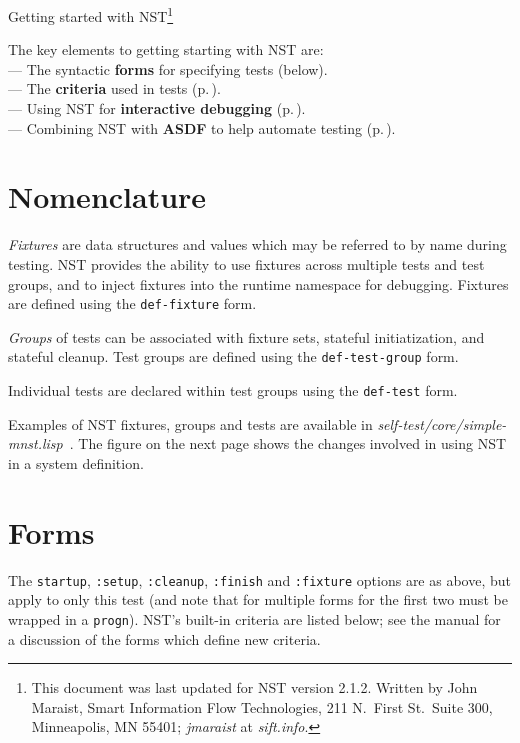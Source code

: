 \documentclass{article}
\begin{document}
\thispagestyle{empty}
\begin{center}
  \LARGE Getting started with NST\footnote{This document was last
    updated for NST version 2.1.2.  Written by John Maraist, Smart
    Information Flow Technologies, 211 N.\ First St.\ Suite 300,
    Minneapolis, MN 55401; \textsl{jmaraist} at \textsl{sift.info}.}
\end{center}

The key elements to getting starting with NST are:
%
\\\hspace*{0.5em}--- The syntactic \textbf{forms} for specifying tests
(below).
%
\\\hspace*{0.5em}--- The \textbf{criteria} used in tests
(p.\,\pageref{sec:criteria}).
%
\\\hspace*{0.5em}--- Using NST for \textbf{interactive debugging}
(p.\,\pageref{sec:interact}).
%
\\\hspace*{0.5em}--- Combining NST with \textbf{ASDF} to help automate
testing (p.\,\pageref{sec:asdf}).

\section*{Nomenclature}
\emph{Fixtures} are data structures and values which may be referred
to by name during testing.  NST provides the ability to use fixtures
across multiple tests and test groups, and to inject fixtures into the
runtime namespace for debugging.  Fixtures are defined using the
\texttt{def-fixture} form.

\emph{Groups} of tests can be associated with fixture sets, stateful
initiatization, and stateful cleanup.  Test groups are defined using
the \texttt{def-test-group} form.

Individual tests are declared within test groups using the
\texttt{def-test} form.

Examples of NST fixtures, groups and tests are available in
\textsl{self-test/core/simple-mnst.lisp}~.  The figure on the next
page shows the changes involved in using NST in a system definition.

\section*{Forms}

%

%
 
The \texttt{startup}, \texttt{:setup}, \texttt{:cleanup},
\texttt{:finish} and \texttt{:fixture} options are as above, but apply
to only this test (and note that for multiple forms for the first two
must be wrapped in a \texttt{progn}).  NST's built-in criteria are
listed below; see the manual for a discussion of the forms which
define new criteria.
\end{document}
